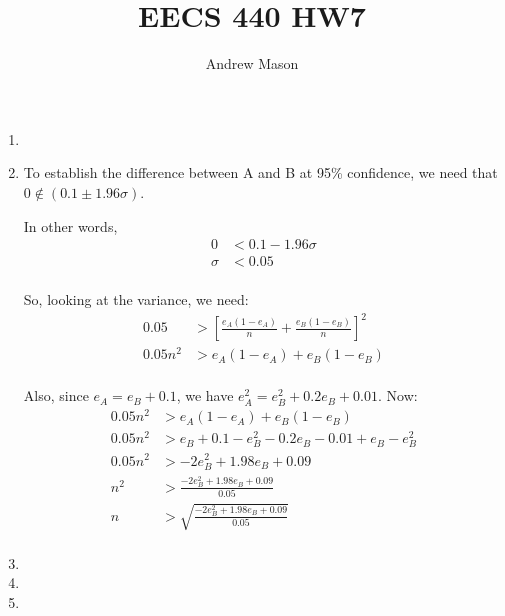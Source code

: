 \documentclass[12pt]{article}
\title{EECS 440 HW7}
\author{Andrew Mason}
\begin{document}
\maketitle

\begin{enumerate}
  \item
  \item
    To establish the difference between A and B at 95\% confidence, we need
    that $0\notin\left(0.1\pm1.96\sigma\right)$.

    In other words,
    \begin{equation}
      \begin{split}
        0&<0.1-1.96\sigma\\
        \sigma&<0.05\\
      \end{split}
    \end{equation}

    So, looking at the variance, we need:
    \begin{equation}
      \begin{split}
        0.05&>\left[\frac{e_A\left(1-e_A\right)}{n}+\frac{e_B\left(1-e_B\right)}{n}\right]^2\\
        0.05n^2&>e_A\left(1-e_A\right)+e_B\left(1-e_B\right)\\
      \end{split}
    \end{equation}

    Also, since $e_A=e_B+0.1$, we have $e_A^2=e_B^2+0.2e_B+0.01$. Now:
    \begin{equation}
      \begin{split}
        0.05n^2&>e_A\left(1-e_A\right)+e_B\left(1-e_B\right)\\
        0.05n^2&>e_B+0.1-e_B^2-0.2e_B-0.01+e_B-e_B^2\\
        0.05n^2&>-2e_B^2+1.98e_B+0.09\\
        n^2&>\frac{-2e_B^2+1.98e_B+0.09}{0.05}\\
        n&>\sqrt{\frac{-2e_B^2+1.98e_B+0.09}{0.05}}\\
      \end{split}
    \end{equation}
  \item
  \item
  \item
\end{enumerate}
\end{document}
